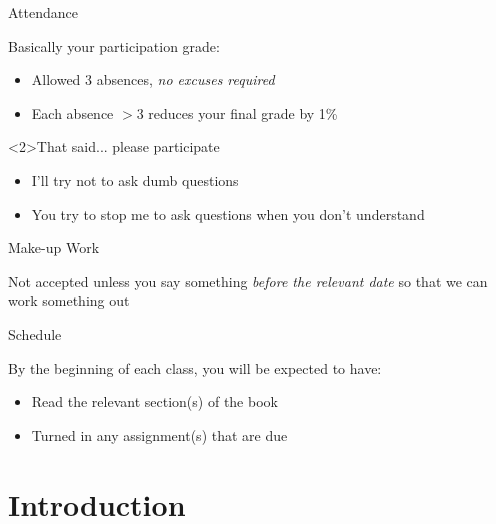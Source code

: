 \documentclass{beamer}
\begin{document}
    \begin{frame}{Attendance}
      \begin{block}{}
        Basically your participation grade:
        \begin{itemize}
          \item Allowed 3 absences, \emph{no excuses required}
          \item Each absence $>$3 reduces your final grade by 1\%
        \end{itemize}
      \end{block}
      \begin{alertblock}<2>{That said... please participate}
        \begin{itemize}
          \item I'll try not to ask dumb questions
          \item You try to stop me to ask questions when you don't understand
        \end{itemize}
      \end{alertblock}
    \end{frame}

    \begin{frame}{Make-up Work}
      \begin{block}{}
        Not accepted unless you say something \emph{before the relevant date} so that we can work something out
      \end{block}
    \end{frame}

    \begin{frame}{Schedule}
      \begin{block}{}
        By the beginning of each class, you will be expected to have:
        \begin{itemize}
          \item Read the relevant section(s) of the book
          \item Turned in any assignment(s) that are due
        \end{itemize}
      \end{block}
    \end{frame}

  \section{Introduction}
\end{document}
